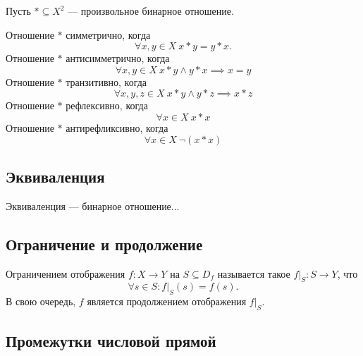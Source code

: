 Пусть $\ast\subseteq X^2$ --- произвольное бинарное отношение.

Отношение $\ast$ {\ital симметрично}, когда
$$\forall x,y\in X\ x\ast y=y\ast x.$$
Отношение $\ast$ {\ital антисимметрично}, когда
$$\forall x,y\in X\ x\ast y\land y\ast x\implies x=y$$
Отношение $\ast$ {\ital транзитивно}, когда
$$\forall x,y,z\in X\ x\ast y\land y\ast z\implies x\ast z$$
Отношение $\ast$ {\ital рефлексивно}, когда
$$\forall x\in X\ x\ast x$$
Отношение $\ast$ {\ital антирефликсивно}, когда
$$\forall x\in X\ \lnot (x\ast x)$$

\subsection{Эквиваленция}

{\bold Эквиваленция} --- бинарное отношение...

\subsection{Ограничение и продолжение}

{\ital Ограничением} отображения $f\colon X\to Y$ на $S\subseteq D_f$ называется
такое $f\vert_S\colon S\to Y$, что
$$\forall s\in S\colon f\vert_S(s)=f(s).$$
В свою очередь, $f$ является {\ital продолжением} отображения $f\vert_S$.

\subsection{Промежутки числовой прямой}

